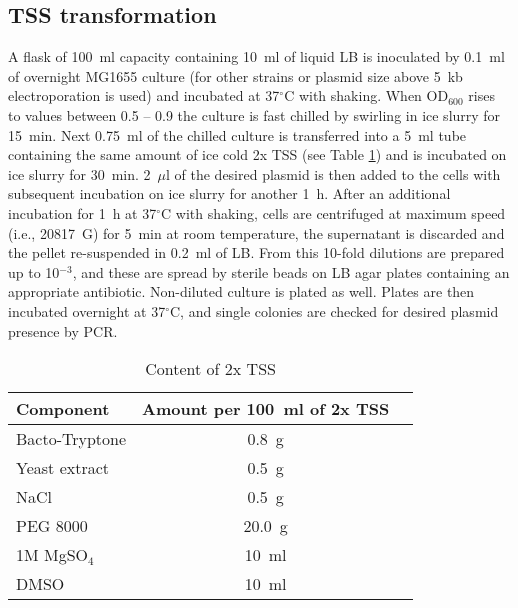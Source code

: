 \subsection{TSS transformation}
A flask of 100~ml capacity containing 10~ml of liquid LB is inoculated by 0.1~ml of overnight MG1655 culture (for other strains or plasmid size above 5~kb electroporation is used) and incubated at 37$^{\circ}$C with shaking.
When OD$_{600}$ rises to values between 0.5 -- 0.9 the culture is fast chilled by swirling in ice slurry for 15~min.
Next 0.75~ml of the chilled culture is transferred into a 5~ml tube containing the same amount of ice cold 2x TSS (see Table \ref{tss}) and is incubated on ice slurry for 30~min.
2~$\mu$l of the desired plasmid is then added to the cells with subsequent incubation on ice slurry for another 1~h.
After an additional incubation for 1~h at 37$^{\circ}$C with shaking, cells are centrifuged at maximum speed (i.e., 20817~G) for 5~min at room temperature, the supernatant is discarded and the pellet re-suspended in 0.2~ml of LB.
From this 10-fold dilutions are prepared up to 10$^{-3}$, and these are spread by sterile beads on LB agar plates containing an appropriate antibiotic.
Non-diluted culture is plated as well.
Plates are then incubated overnight at 37$^{\circ}$C, and single colonies are checked for desired plasmid presence by PCR.


\begin{center}
    \begin{longtable}[c]{|l|c|c|}
\caption{Content of 2x TSS} \label{tss} \\

\toprule \multicolumn{1}{|l|}{\textbf{Component}} & \multicolumn{1}{c|}{\textbf{Amount per 100~ml of 2x TSS}} \\
\midrule
\endhead

\bottomrule
\endlastfoot

Bacto-Tryptone & 0.8~g \\
\hline
Yeast extract & 0.5~g \\
\hline
NaCl & 0.5~g \\
\hline
PEG 8000 & 20.0~g \\
\hline
1M MgSO$_{4}$ & 10~ml \\
\hline
DMSO & 10~ml \\
    \end{longtable}
\end{center}


